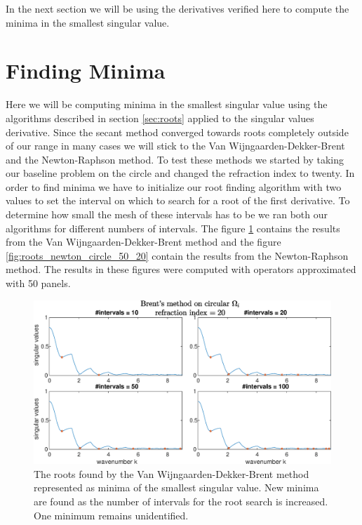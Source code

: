 \documentclass[a4paper, oneside]{discothesis}
\begin{document}
In the next section we will be using the derivatives verified here to compute the minima in the smallest singular value.

\section{Finding Minima}
Here we will be computing minima in the smallest singular value using the algorithms described in section \ref{sec:roots} applied to the singular values derivative.
Since the secant method converged towards roots completely outside of our range in many cases we will stick to the Van Wijngaarden-Dekker-Brent and the Newton-Raphson method.
To test these methods we started by taking our baseline problem on the circle and changed the refraction index to twenty.
In order to find minima we have to initialize our root finding algorithm with two values to set the interval on which to search for a root of the first derivative.
To determine how small the mesh of these intervals has to be we ran both our algorithms for different numbers of intervals.
The figure \ref{fig:roots_brent_circle_50_20} contains the results from the Van Wijngaarden-Dekker-Brent method and the figure \ref{fig:roots_newton_circle_50_20} contain the results from the Newton-Raphson method.
The results in these figures were computed with operators approximated with 50 panels.
\begin{figure} [H]
	\centering
	\includegraphics[width=\columnwidth]{figures/roots_brent_circle_50_20.eps}
	\caption{
		The roots found by the Van Wijngaarden-Dekker-Brent method represented as minima of the smallest singular value.
		New minima are found as the number of intervals for the root search is increased.
		One minimum remains unidentified.
	}

	\label{fig:roots_brent_circle_50_20}
\end{figure}
\end{document}

